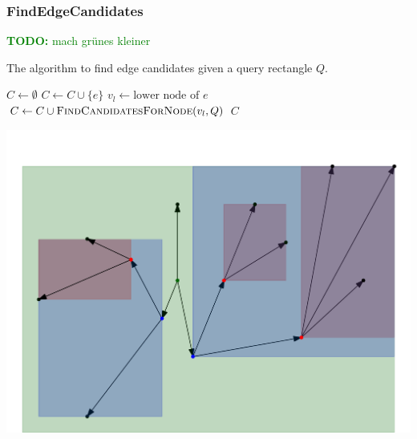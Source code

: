 \documentclass{beamer}
\newcommand{\TODO}[1]{\noindent\textcolor{green}{\textbf{TODO:} #1}}
\newcommand{\findEdgeCandidates}{FindEdgeCandidates\xspace}
\begin{document}
\begin{frame}
	\frametitle{\findEdgeCandidates}
	\TODO{mach grünes kleiner}
	\begin{algorithm}[H]
		{\small
			\caption{The algorithm to find edge candidates given a query rectangle $Q$.}
			\begin{algorithmic}[1]
				\State $C \gets \emptyset$
				\State $C \gets C \cup \{e\}$
				\EndIf
				\State $v_l \gets \text{lower node of $e$}$
				\State $C \gets C \cup \Call{FindCandidatesForNode}{v_l, Q}$
				\EndIf
				\EndFor
				\State \Return $C$
				\EndProcedure
			\end{algorithmic}
		}
	\end{algorithm}
	\includegraphics[width=.76\columnwidth]{images/downgraphBox}
\end{frame}
\end{document}
